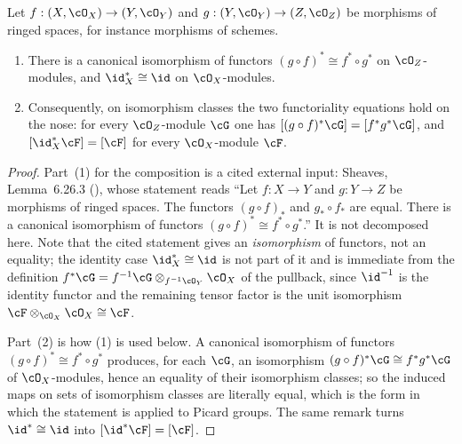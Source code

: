 \begin{lemma}
\label{lem:pc-pullback-composition}
Let $f:(X,\cO_X)\to(Y,\cO_Y)$ and $g:(Y,\cO_Y)\to(Z,\cO_Z)$ be
morphisms of ringed spaces, for instance morphisms of schemes.
\begin{enumerate}
\item There is a canonical isomorphism of functors
$(g\circ f)^*\cong f^*\circ g^*$ on $\cO_Z$-modules, and
$\id_X^*\cong\id$ on $\cO_X$-modules.
\item Consequently, on isomorphism classes the two functoriality
equations hold on the nose: for every $\cO_Z$-module $\cG$ one has
$[(g\circ f)^*\cG]=[f^*g^*\cG]$, and $[\id_X^*\cF]=[\cF]$ for every
$\cO_X$-module $\cF$.
\end{enumerate}
\end{lemma}
\begin{proof}
Part~(1) for the composition is a cited external input: Sheaves,
Lemma~6.26.3 (), whose statement reads ``Let
$f:X\to Y$ and $g:Y\to Z$ be morphisms of ringed spaces.  The functors
$(g\circ f)_*$ and $g_*\circ f_*$ are equal.  There is a canonical
isomorphism of functors $(g\circ f)^*\cong f^*\circ g^*$.''  It is not
decomposed here.  Note that the cited statement gives an
\emph{isomorphism} of functors, not an equality; the identity case
$\id_X^*\cong\id$ is not part of it and is immediate from the definition
$f^*\cG=f^{-1}\cG\otimes_{f^{-1}\cO_Y}\cO_X$ of the pullback, since
$\id^{-1}$ is the identity functor and the remaining tensor factor is
the unit isomorphism $\cF\otimes_{\cO_X}\cO_X\cong\cF$.

Part~(2) is how (1) is used below.  A canonical isomorphism of
functors $(g\circ f)^*\cong f^*\circ g^*$ produces, for each $\cG$, an
isomorphism $(g\circ f)^*\cG\cong f^*g^*\cG$ of $\cO_X$-modules, hence
an equality of their isomorphism classes; so the induced maps on sets
of isomorphism classes are literally equal, which is the form in which
the statement is applied to Picard groups.  The same remark turns
$\id^*\cong\id$ into $[\id^*\cF]=[\cF]$.
\end{proof}


